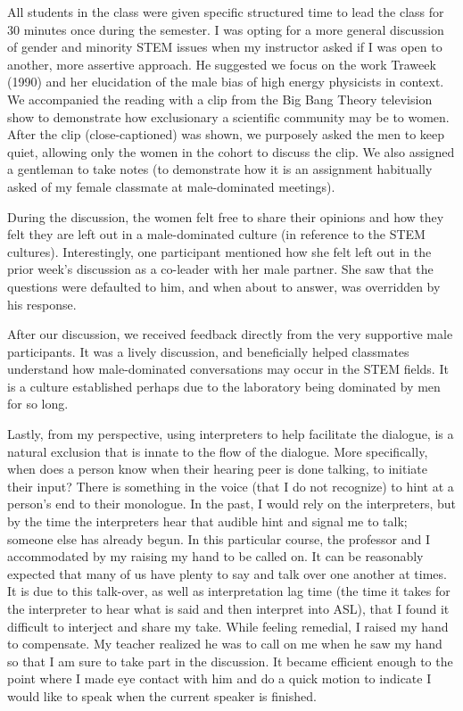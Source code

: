 \documentclass[11.5pt]{sig-alternate} %
\begin{document}
\begin{large}
All students in the class were given specific structured time to lead the class for 30 minutes once during the semester.  I was opting for a more general discussion of gender and minority STEM issues when my instructor asked if I was open to another, more assertive approach.  He suggested we focus on the work Traweek (1990) and her elucidation of the male bias of high energy physicists in context.  We accompanied the reading with a clip from the Big Bang Theory television show to demonstrate how exclusionary a scientific community may be to women.  After the clip (close-captioned) was shown, we purposely asked the men to keep quiet, allowing only the women in the cohort to discuss the clip.  We also assigned a gentleman to take notes (to demonstrate how it is an assignment habitually asked of my female classmate at male-dominated meetings).

During the discussion, the women felt free to share their opinions and how they felt they are left out in a male-dominated culture (in reference to the STEM cultures).  Interestingly, one participant mentioned how she felt left out in the prior week’s discussion as a co-leader with her male partner.  She saw that the questions were defaulted to him, and when about to answer, was overridden by his response.

After our discussion, we received feedback directly from the very supportive male participants.  It was a lively discussion, and beneficially helped classmates understand how male-dominated conversations may occur in the STEM fields.  It is a culture established perhaps due to the laboratory being dominated by men for so long.

Lastly, from my perspective, using interpreters to help facilitate the dialogue, is a natural exclusion that is innate to the flow of the dialogue.  More specifically, when does a person know when their hearing peer is done talking, to initiate their input?  There is something in the voice (that I do not recognize) to hint at a person’s end to their monologue.  In the past, I would rely on the interpreters, but by the time the interpreters hear that audible hint and signal me to talk; someone else has already begun. In this particular course, the professor and I accommodated by my raising my hand to be called on. It can be reasonably expected that many of us have plenty to say and talk over one another at times.  It is due to this talk-over, as well as interpretation lag time (the time it takes for the interpreter to hear what is said and then interpret into ASL), that I found it difficult to interject and share my take.  While feeling remedial, I raised my hand to compensate.  My teacher realized he was to call on me when he saw my hand so that I am sure to take part in the discussion.  It became efficient enough to the point where I made eye contact with him and do a quick motion to indicate I would like to speak when the current speaker is finished.   


\end{large}
\end{document}
